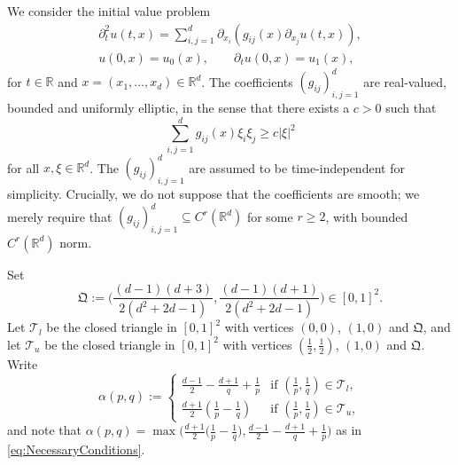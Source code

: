 \documentclass{amsart}
\numberwithin{equation}{section}
\theoremstyle{definition}
\newcommand{\R}{\mathbb{R}}
\newcommand{\Rd}{\mathbb{R}^{d}}
\begin{document}
We consider the initial value problem
\begin{equation}\label{eq:RoughWaveEquation}
\begin{gathered}
\partial_t^2 u(t,x) = \sum_{i,j=1}^{d}\partial_{x_{i}}(g_{ij}(x) \partial_{x_{j}} u(t,x)), \\
u(0,x) = u_0(x),\qquad\partial_{t}u(0,x) = u_1(x),
\end{gathered}
\end{equation}
for $t\in \R$ and $x=(x_{1},\ldots,x_{d})\in \R^d$. The coefficients $(g_{ij})_{i,j=1}^{d}$ are real-valued, bounded and uniformly elliptic, in the sense that there exists a $c>0$ such that
\[
\sum_{i,j=1}^{d}g_{ij}(x)\xi_{i}\xi_{j}\geq c|\xi|^{2}%
\]
for all $x,\xi\in\Rd$. The $(g_{ij})_{i,j=1}^{d}$ are assumed to be time-independent for simplicity.  
Crucially, we do not suppose that the coefficients are smooth; we merely require that $(g_{ij})_{i,j=1}^{d}\subseteq C^{r}(\Rd)$ for some $r\geq 2$, with bounded $C^{r}(\Rd)$ norm. 

Set
\begin{equation}\label{eq:Q}
\mathfrak{Q}:=\Big(\frac{(d-1)(d+3)}{2(d^{2}+2d-1)},\frac{(d-1)(d+1)}{2(d^{2}+2d-1)}\Big)\in[0,1]^{2}.
\end{equation}
Let $\mathcal{T}_{l}$ be the closed triangle in $[0,1]^{2}$ with vertices $(0,0)$, $(1,0)$ and $\mathfrak{Q}$, and let $\mathcal{T}_{u}$ be the closed triangle in $[0,1]^{2}$ with vertices $(\frac{1}{2},\frac{1}{2})$, $(1,0)$ and $\mathfrak{Q}$. Write
\begin{equation}\label{eq:alphapq}
\alpha(p,q):=\begin{cases}
\frac{d-1}{2}-\frac{d+1}{q}+\frac{1}{p}&\text{if }(\frac{1}{p},\frac{1}{q})\in \mathcal{T}_{l},\\
\frac{d+1}{2}(\frac{1}{p}-\frac{1}{q})&\text{if }(\frac{1}{p},\frac{1}{q})\in \mathcal{T}_{u},
\end{cases}
\end{equation}
and note that $\alpha(p,q)=\max\big(\tfrac{d+1}{2} \big( \tfrac{1}{p} - \tfrac{1}{q} \big), \tfrac{d-1}{2} - \tfrac{d+1}{q} + \tfrac{1}{p}\big)$ as in \eqref{eq:NecessaryConditions}.
\end{document}
